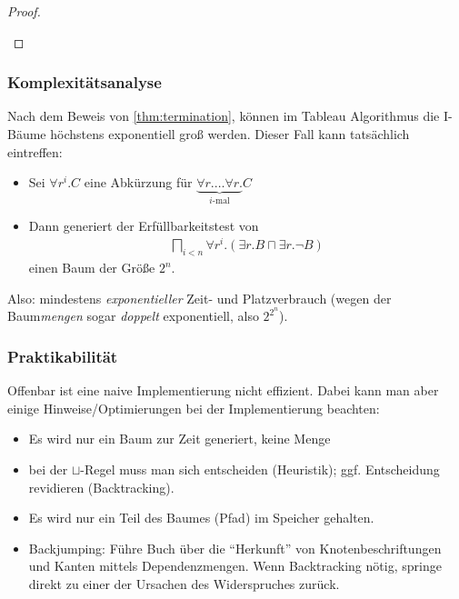 \begin{proof}
\begin{tafel}
\begin{itemize}
\end{itemize}

\end{tafel}


\end{proof}

\subsubsection{Komplexitätsanalyse}\label{praktikabilituxe4t}

Nach dem Beweis von \autoref{thm:termination}, können im Tableau Algorithmus die I-Bäume höchstens exponentiell groß werden. Dieser Fall kann tatsächlich eintreffen:
\begin{itemize}
    \item Sei $\forall r^i.C$ eine Abkürzung für $\underbrace{\forall r.\ldots \forall r.}_{i\text{-mal}}C$
    \item Dann generiert der Erfüllbarkeitstest von
        \begin{align*}
            \bigsqcap_{i < n} \forall r^i.(\exists r.B \sqcap \exists r.\neg B)
        \end{align*}
        einen Baum der Größe $2^n$.
\end{itemize}
\begin{tafel}[TODO]

\end{tafel}

Also: mindestens \emph{exponentieller} Zeit- und Platzverbrauch (wegen der Baum\emph{mengen} sogar \emph{doppelt} exponentiell, also $2^2^n$).

\subsubsection{Praktikabilität}

Offenbar ist eine naive Implementierung nicht effizient. Dabei kann man aber einige Hinweise/Optimierungen bei der Implementierung beachten:

\begin{itemize}
	\item Es wird nur ein Baum zur Zeit generiert, keine Menge
	\item bei der $\sqcup$-Regel muss man sich entscheiden (Heuristik); ggf. Entscheidung revidieren (Backtracking).
	\item Es wird nur ein Teil des Baumes (Pfad) im Speicher gehalten.
    \item Backjumping: Führe Buch über die \enquote{Herkunft} von Knotenbeschriftungen und Kanten mittels Dependenzmengen. Wenn Backtracking nötig, springe direkt zu einer der Ursachen des Widerspruches zurück.
\end{itemize}

